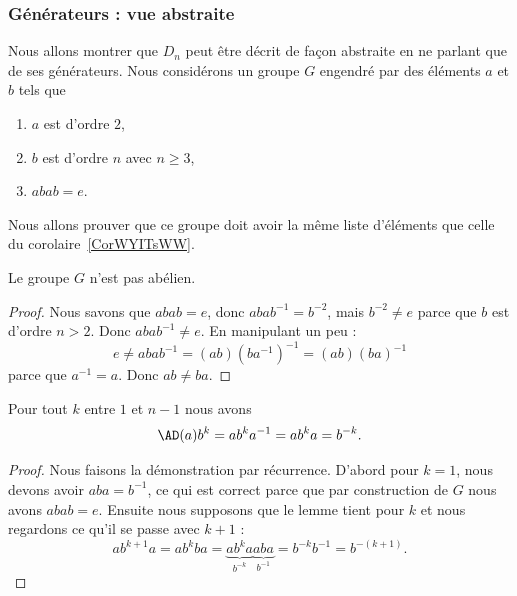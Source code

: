 \subsubsection{Générateurs : vue abstraite}

\begin{normaltext}      \label{NORMooCCUEooRRENed}
	Nous allons montrer que \( D_n\) peut être décrit de façon abstraite en ne parlant que de ses générateurs. Nous considérons un groupe \( G\) engendré par des éléments \( a\) et \( b\) tels que
	\begin{enumerate}
		\item
		      \( a\) est d'ordre \( 2\),
		\item
		      \( b\) est d'ordre \( n\) avec \( n\geq 3\),
		\item
		      \( abab=e\).
	\end{enumerate}
	Nous allons prouver que ce groupe doit avoir la même liste d'éléments que celle du corolaire~\ref{CorWYITsWW}.
\end{normaltext}

\begin{proposition}
	Le groupe \( G\) n'est pas abélien.
\end{proposition}

\begin{proof}
	Nous savons que \( abab=e\), donc \( abab^{-1}=b^{-2}\), mais \( b^{-2}\neq e\) parce que \( b\) est d'ordre \( n>2\). Donc \( abab^{-1}\neq e\). En manipulant un peu :
	\begin{equation}
		e\neq abab^{-1}=(ab)(ba^{-1})^{-1}=(ab)(ba)^{-1}
	\end{equation}
	parce que \( a^{-1}=a\). Donc \( ab\neq ba\).
\end{proof}

\begin{lemma}        \label{LemKKXdqdL}
	Pour tout \( k\) entre \( 1\) et \( n-1\) nous avons
	\begin{equation}
		\AD(a)b^k=ab^ka^{-1}=ab^ka=b^{-k}.
	\end{equation}
\end{lemma}

\begin{proof}
	Nous faisons la démonstration par récurrence. D'abord pour \( k=1\), nous devons avoir \( aba=b^{-1}\), ce qui est correct parce que par construction de \( G\) nous avons \( abab=e\). Ensuite nous supposons que le lemme tient pour \( k\) et nous regardons ce qu'il se passe avec \( k+1\) :
	\begin{equation}
		ab^{k+1}a=ab^kba=\underbrace{ab^ka}_{b^{-k}}\underbrace{aba}_{b^{-1}}=b^{-k}b^{-1}=b^{-(k+1)}.
	\end{equation}
\end{proof}

